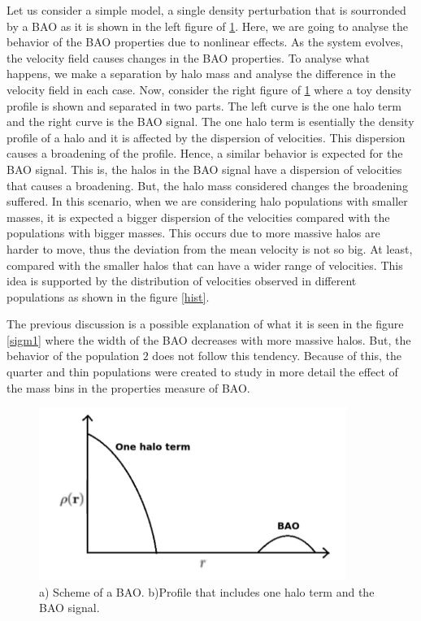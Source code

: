Let us consider a simple model, a single density perturbation that is sourronded 
by a BAO as it is shown in the left figure of \ref{toy_pro}. 
Here, we are going to analyse the behavior of the BAO properties due to nonlinear 
effects. As the system evolves, the velocity field causes changes in the BAO properties. 
To analyse what happens, we make a separation by halo mass and analyse the difference
in the velocity field in each case. 
Now, consider the right figure of \ref{toy_pro} where a toy density profile is shown 
and separated in two parts. The left curve is 
the one halo term  and the right curve is the BAO signal. 
The one halo term is esentially the density profile of a halo 
and it is affected by the dispersion of velocities. 
This dispersion causes a broadening of the profile. Hence, a similar behavior 
is expected for the BAO signal. This is, the halos 
in the BAO signal have a dispersion of velocities that causes a broadening.
But, the halo mass considered changes the broadening suffered. 
In this scenario, when we are considering halo populations with smaller 
masses, it is expected a bigger dispersion of the velocities compared with the populations 
with bigger masses. 	This occurs due to more massive halos are harder to move, thus the 
deviation from the mean velocity is not so big. At least,  compared  with the smaller halos 
that can have a wider range of velocities. This idea is supported by the distribution
of velocities observed in different populations as shown in the figure \ref{hist}.


The previous discussion is a possible explanation of what it is seen in the
figure \ref{sigm1} where the width of the BAO decreases with more massive halos.
But, the behavior of the population $2$ does not follow this tendency. Because of this,
the quarter and thin populations were created to study in more detail the effect of
the mass bins in the properties measure of BAO. 

\begin{figure}[htbp]
       \centering
    \includegraphics[width=100mm]{Images/chapter4/toy_pro.png}
\caption{\small a) Scheme of a BAO. b)Profile that includes one halo term and the BAO signal.}
       \label{toy_pro}
 \end{figure}


